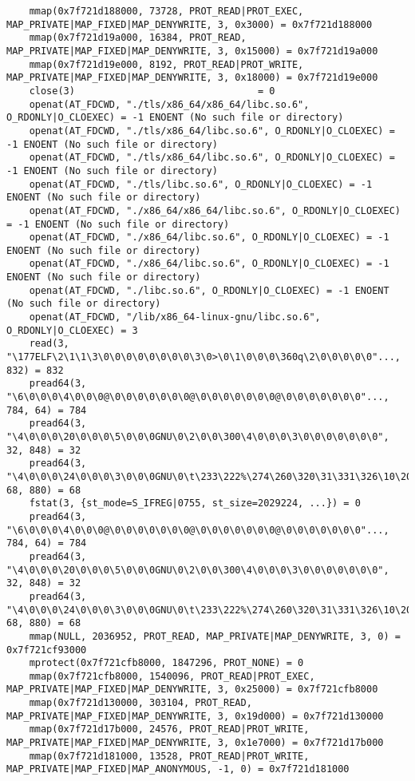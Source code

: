\documentclass[pdf, unicode, 12pt, a4paper,oneside,fleqn]{article}
\begin{document}
{\begin{verbatim}
    mmap(0x7f721d188000, 73728, PROT_READ|PROT_EXEC, MAP_PRIVATE|MAP_FIXED|MAP_DENYWRITE, 3, 0x3000) = 0x7f721d188000
    mmap(0x7f721d19a000, 16384, PROT_READ, MAP_PRIVATE|MAP_FIXED|MAP_DENYWRITE, 3, 0x15000) = 0x7f721d19a000
    mmap(0x7f721d19e000, 8192, PROT_READ|PROT_WRITE, MAP_PRIVATE|MAP_FIXED|MAP_DENYWRITE, 3, 0x18000) = 0x7f721d19e000
    close(3)                                = 0
    openat(AT_FDCWD, "./tls/x86_64/x86_64/libc.so.6", O_RDONLY|O_CLOEXEC) = -1 ENOENT (No such file or directory)
    openat(AT_FDCWD, "./tls/x86_64/libc.so.6", O_RDONLY|O_CLOEXEC) = -1 ENOENT (No such file or directory)
    openat(AT_FDCWD, "./tls/x86_64/libc.so.6", O_RDONLY|O_CLOEXEC) = -1 ENOENT (No such file or directory)
    openat(AT_FDCWD, "./tls/libc.so.6", O_RDONLY|O_CLOEXEC) = -1 ENOENT (No such file or directory)
    openat(AT_FDCWD, "./x86_64/x86_64/libc.so.6", O_RDONLY|O_CLOEXEC) = -1 ENOENT (No such file or directory)
    openat(AT_FDCWD, "./x86_64/libc.so.6", O_RDONLY|O_CLOEXEC) = -1 ENOENT (No such file or directory)
    openat(AT_FDCWD, "./x86_64/libc.so.6", O_RDONLY|O_CLOEXEC) = -1 ENOENT (No such file or directory)
    openat(AT_FDCWD, "./libc.so.6", O_RDONLY|O_CLOEXEC) = -1 ENOENT (No such file or directory)
    openat(AT_FDCWD, "/lib/x86_64-linux-gnu/libc.so.6", O_RDONLY|O_CLOEXEC) = 3
    read(3, "\177ELF\2\1\1\3\0\0\0\0\0\0\0\0\3\0>\0\1\0\0\0\360q\2\0\0\0\0\0"..., 832) = 832
    pread64(3, "\6\0\0\0\4\0\0\0@\0\0\0\0\0\0\0@\0\0\0\0\0\0\0@\0\0\0\0\0\0\0"..., 784, 64) = 784
    pread64(3, "\4\0\0\0\20\0\0\0\5\0\0\0GNU\0\2\0\0\300\4\0\0\0\3\0\0\0\0\0\0\0", 32, 848) = 32
    pread64(3, "\4\0\0\0\24\0\0\0\3\0\0\0GNU\0\t\233\222%\274\260\320\31\331\326\10\204\276X>\263"..., 68, 880) = 68
    fstat(3, {st_mode=S_IFREG|0755, st_size=2029224, ...}) = 0
    pread64(3, "\6\0\0\0\4\0\0\0@\0\0\0\0\0\0\0@\0\0\0\0\0\0\0@\0\0\0\0\0\0\0"..., 784, 64) = 784
    pread64(3, "\4\0\0\0\20\0\0\0\5\0\0\0GNU\0\2\0\0\300\4\0\0\0\3\0\0\0\0\0\0\0", 32, 848) = 32
    pread64(3, "\4\0\0\0\24\0\0\0\3\0\0\0GNU\0\t\233\222%\274\260\320\31\331\326\10\204\276X>\263"..., 68, 880) = 68
    mmap(NULL, 2036952, PROT_READ, MAP_PRIVATE|MAP_DENYWRITE, 3, 0) = 0x7f721cf93000
    mprotect(0x7f721cfb8000, 1847296, PROT_NONE) = 0
    mmap(0x7f721cfb8000, 1540096, PROT_READ|PROT_EXEC, MAP_PRIVATE|MAP_FIXED|MAP_DENYWRITE, 3, 0x25000) = 0x7f721cfb8000
    mmap(0x7f721d130000, 303104, PROT_READ, MAP_PRIVATE|MAP_FIXED|MAP_DENYWRITE, 3, 0x19d000) = 0x7f721d130000
    mmap(0x7f721d17b000, 24576, PROT_READ|PROT_WRITE, MAP_PRIVATE|MAP_FIXED|MAP_DENYWRITE, 3, 0x1e7000) = 0x7f721d17b000
    mmap(0x7f721d181000, 13528, PROT_READ|PROT_WRITE, MAP_PRIVATE|MAP_FIXED|MAP_ANONYMOUS, -1, 0) = 0x7f721d181000

\end{verbatim}}
\end{document}
